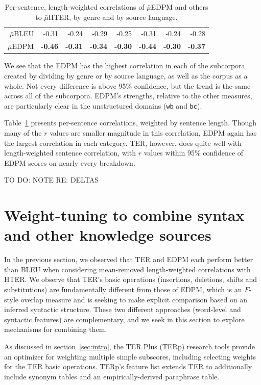 \documentclass{kluwer}    %
\begin{document}
\begin{article}
\begin{subtable}
\begin{table}
\begin{tabular}{r|rrrr|rr|r}
      $\bar{\mu}$BLEU
      & -0.31 & -0.24  & -0.29 &  -0.25
      & -0.31  &  -0.24  & -0.28 \\
      $\bar{\mu}$EDPM
      & \textbf{-0.46} & \textbf{-0.31} & \textbf{-0.34} &
      \textbf{-0.30}
      & \textbf{-0.44} & \textbf{-0.30} & \textbf{-0.37} \\
      \hline
    \end{tabular}
    \caption{Per-sentence, length-weighted correlations of
      $\bar{\mu}$EDPM and others to $\bar{\mu}$HTER, by genre and by
      source language.}
    \label{tab:hterpersent}
  \end{table}
\end{subtable}
We see that the EDPM has the highest correlation in each of the
subcorpora created by dividing by genre or by source language, as well
as the corpus as a whole.  Not every difference is above 95\%
confidence, but the trend is the same across all of the
subcorpora. EDPM's strengths, relative to the other measures, are
particularly clear in the unstructured domains (\texttt{wb} and
\texttt{bc}).

Table~\ref{tab:hterpersent} presents per-sentence correlations,
weighted by sentence length.  Though many of the $r$ values are
smaller magnitude in this correlation, EDPM again has the largest
correlation in each category.  TER, however, does quite well with
length-weighted sentence correlation, with $r$ values within 95\%
confidence of EDPM scores on nearly every breakdown.


TO DO: NOTE RE: DELTAS

\section{Weight-tuning to combine syntax and other knowledge sources}
\label{sec:hter2}

In the previous section, we observed that TER and EDPM each perform
better than BLEU when considering mean-removed length-weighted
correlations with HTER.  We observe that TER's basic operations
(insertions, deletions, shifts and substitutions) are fundamentally
different from those of EDPM, which is an $F$-style overlap measure
and is seeking to make explicit comparison based on an inferred
syntactic structure.  These two different approaches (word-level and
syntactic features) are complementary, and we seek in this section to
explore mechanisms for combining them.

As discussed in section~\ref{sec:intro}, the TER Plus (TERp) research
tools \cite{snover09terp} provide an optimizer for weighting multiple
simple subscores, including selecting weights for the TER basic
operations. TERp's feature list extends TER to additionally include
synonym tables and an empirically-derived paraphrase table.


\end{article}
\end{document}

